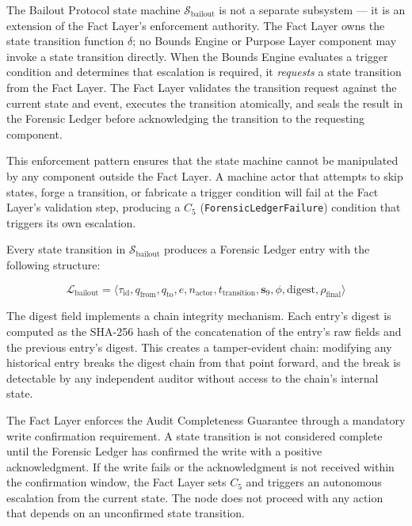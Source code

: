 The Bailout Protocol state machine $\mathcal{S}_{\text{bailout}}$ is not a separate
subsystem — it is an extension of the Fact Layer's enforcement authority. The Fact
Layer owns the state transition function $\delta$; no Bounds Engine or Purpose Layer
component may invoke a state transition directly. When the Bounds Engine evaluates a
trigger condition and determines that escalation is required, it \emph{requests} a
state transition from the Fact Layer. The Fact Layer validates the transition request
against the current state and event, executes the transition atomically, and seals
the result in the Forensic Ledger before acknowledging the transition to the requesting
component.

This enforcement pattern ensures that the state machine cannot be manipulated by any
component outside the Fact Layer. A machine actor that attempts to skip states, forge
a transition, or fabricate a trigger condition will fail at the Fact Layer's validation
step, producing a $C_5$ (\texttt{ForensicLedgerFailure}) condition that triggers its
own escalation.

Every state transition in $\mathcal{S}_{\text{bailout}}$ produces a Forensic Ledger
entry with the following structure:

\begin{equation}
\mathcal{L}_{\text{bailout}} = \bigl\langle
  \tau_{\text{id}},         %
  q_{\text{from}},           %
  q_{\text{to}},             %
  e,                         %
  n_{\text{actor}},          %
  t_{\text{transition}},     %
  \mathbf{s}_9,            %
  \phi,                      %
  \text{digest},            %
  \rho_{\text{final}}        %
\bigr\rangle
\end{equation}

The digest field implements a chain integrity mechanism. Each entry's digest is
computed as the SHA-256 hash of the concatenation of the entry's raw fields and the
previous entry's digest. This creates a tamper-evident chain: modifying any
historical entry breaks the digest chain from that point forward, and the break is
detectable by any independent auditor without access to the chain's internal state.

The Fact Layer enforces the Audit Completeness Guarantee through a mandatory write
confirmation requirement. A state transition is not considered complete until the
Forensic Ledger has confirmed the write with a positive acknowledgment. If the write
fails or the acknowledgment is not received within the confirmation window, the Fact
Layer sets $C_5$ and triggers an autonomous escalation from the current state. The
node does not proceed with any action that depends on an unconfirmed state
transition.

